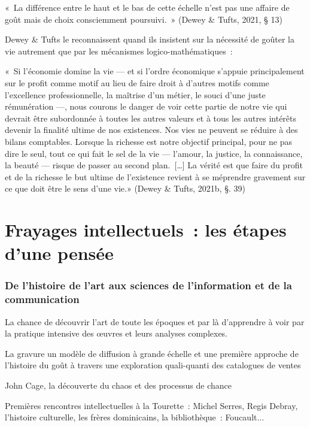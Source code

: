 \documentclass[
  letterpaper,
  DIV=11,
  numbers=noendperiod]{scrreprt}
\begin{document}
«~La différence entre le haut et le bas de cette échelle n'est pas une
affaire de goût mais de choix consciemment poursuivi.~» (Dewey \& Tufts,
2021, § 13)

Dewey \& Tufts le reconnaissent quand ils insistent sur la nécessité de
goûter la vie autrement que par les mécanismes logico-mathématiques~:

«~Si l'économie domine la vie --- et si l'ordre économique s'appuie
principalement sur le profit comme motif au lieu de faire droit à
d'autres motifs comme l'excellence professionnelle, la maîtrise d'un
métier, le souci d'une juste rémunération ---, nous courons le danger de
voir cette partie de notre vie qui devrait être subordonnée à toutes les
autres valeurs et à tous les autres intérêts devenir la finalité ultime
de nos existences. Nos vies ne peuvent se réduire à des bilans
comptables. Lorsque la richesse est notre objectif principal, pour ne
pas dire le seul, tout ce qui fait le sel de la vie --- l'amour, la
justice, la connaissance, la beauté --- risque de passer au second
plan.~{[}\ldots{]} La vérité est que faire du profit et de la richesse
le but ultime de l'existence revient à se méprendre gravement sur ce que
doit être le sens d'une vie.» (Dewey \& Tufts, 2021b, §. 39)

\hypertarget{sec-frayages}{%
\chapter{Frayages intellectuels~: les étapes d'une
pensée}\label{sec-frayages}}

\hypertarget{de-lhistoire-de-lart-aux-sciences-de-linformation-et-de-la-communication}{%
\subsection{De l'histoire de l'art aux sciences de l'information et de
la
communication}\label{de-lhistoire-de-lart-aux-sciences-de-linformation-et-de-la-communication}}

La chance de découvrir l'art de toute les époques et par là d'apprendre
à voir par la pratique intensive des œuvres et leurs analyses complexes.

La gravure un modèle de diffusion à grande échelle et une première
approche de l'histoire du goût à travers une exploration quali-quanti
des catalogues de ventes

John Cage, la découverte du chaos et des processus de chance

Premières rencontres intellectuelles à la Tourette~: Michel Serres,
Regis Debray, l'histoire culturelle, les frères dominicains, la
bibliothèque~: Foucault...
\end{document}
